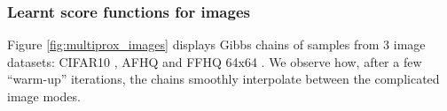 \subsubsection{Learnt score functions for images}















Figure \ref{fig:multiprox_images} displays Gibbs chains of samples from 3 image datasets: CIFAR10 \cite{krizhevsky_learning_2009}, AFHQ \cite{choi_stargan_2020} and FFHQ 64x64 \cite{karras_style-based_2019}. We observe how, after a few \enquote{warm-up} iterations, the chains smoothly interpolate between the complicated image modes.


